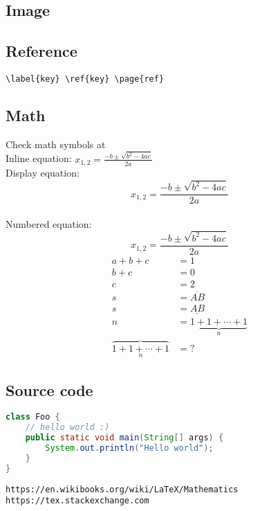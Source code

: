 \documentclass{article}
\newcommand{\site}[2][protocol]{\texttt{#1://#2}}
\begin{document}
\subsection{Image}
\subsection{Reference}
\verb|\label{key} \ref{key} \page{ref}|

\subsection{Math}
Check math symbols at \cite{R01}
\\Inline equation:
\( x_{1,2} = \frac{-b \pm \sqrt{b^2-4ac}}{2a} \)
\\Display equation:
\[ x_{1,2} = \frac{-b \pm \sqrt{b^2-4ac}}{2a} \]
\\Numbered equation:
\begin{equation}
x_{1,2} = \frac{-b \pm \sqrt{b^2-4ac}}{2a}
\end{equation}
\begin{align*}
  a + b + c &= 1\\
  b + c &= 0\\
  c &= 2\\
  s &= \overline{AB}\\
  s &= \underline{AB}\\
  n &= \underbrace{1+1+\cdots+1}_n\\
  \overbrace{1+1+\cdots+1}_n &= ?
\end{align*}

\subsection{Source code}
\begin{lstlisting}[language=Java]
class Foo {
	// hello world :)
	public static void main(String[] args) {
		System.out.println("Hello world");
	}
}
\end{lstlisting}

\begin{thebibliography}{widest label}
   \site[https]{en.wikibooks.org/wiki/LaTeX/Mathematics}
   \site[https]{tex.stackexchange.com}
\end{thebibliography}
\end{document}

